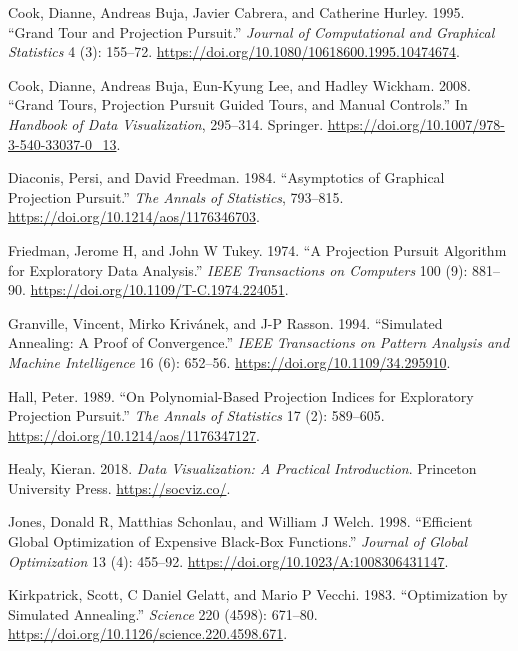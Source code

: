 \begin{CSLReferences}{1}{0}
\leavevmode{}%
Cook, Dianne, Andreas Buja, Javier Cabrera, and Catherine Hurley. 1995. {``Grand Tour and Projection Pursuit.''} \emph{Journal of Computational and Graphical Statistics} 4 (3): 155--72. \url{https://doi.org/10.1080/10618600.1995.10474674}.

\leavevmode{}%
Cook, Dianne, Andreas Buja, Eun-Kyung Lee, and Hadley Wickham. 2008. {``Grand Tours, Projection Pursuit Guided Tours, and Manual Controls.''} In \emph{Handbook of Data Visualization}, 295--314. Springer. \url{https://doi.org/10.1007/978-3-540-33037-0_13}.

\leavevmode{}%
Diaconis, Persi, and David Freedman. 1984. {``Asymptotics of Graphical Projection Pursuit.''} \emph{The Annals of Statistics}, 793--815. \url{https://doi.org/10.1214/aos/1176346703}.

\leavevmode{}%
Friedman, Jerome H, and John W Tukey. 1974. {``A Projection Pursuit Algorithm for Exploratory Data Analysis.''} \emph{IEEE Transactions on Computers} 100 (9): 881--90. \url{https://doi.org/10.1109/T-C.1974.224051}.

\leavevmode{}%
Granville, Vincent, Mirko Krivánek, and J-P Rasson. 1994. {``Simulated Annealing: A Proof of Convergence.''} \emph{IEEE Transactions on Pattern Analysis and Machine Intelligence} 16 (6): 652--56. \url{https://doi.org/10.1109/34.295910}.

\leavevmode{}%
Hall, Peter. 1989. {``On Polynomial-Based Projection Indices for Exploratory Projection Pursuit.''} \emph{The Annals of Statistics} 17 (2): 589--605. \url{https://doi.org/10.1214/aos/1176347127}.

\leavevmode{}%
Healy, Kieran. 2018. \emph{Data Visualization: A Practical Introduction}. Princeton University Press. \url{https://socviz.co/}.

\leavevmode{}%
Jones, Donald R, Matthias Schonlau, and William J Welch. 1998. {``Efficient Global Optimization of Expensive Black-Box Functions.''} \emph{Journal of Global Optimization} 13 (4): 455--92. \url{https://doi.org/10.1023/A:1008306431147}.

\leavevmode{}%
Kirkpatrick, Scott, C Daniel Gelatt, and Mario P Vecchi. 1983. {``Optimization by Simulated Annealing.''} \emph{Science} 220 (4598): 671--80. \url{https://doi.org/10.1126/science.220.4598.671}.


\end{CSLReferences}
